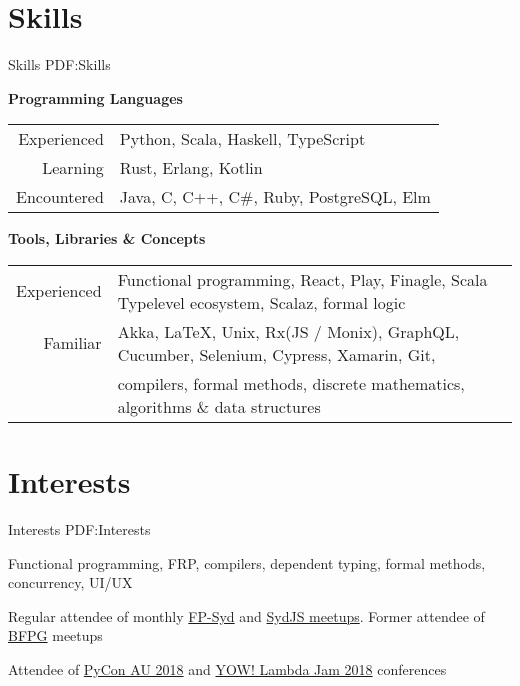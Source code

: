 \documentclass[a4paper,10pt,oneside]{article}
\begin{document}
\begin{minipage}[t][0pt]{\linewidth}
\begin{body}

\section
{Skills}
{Skills}
{PDF:Skills}

\textbf{Programming Languages}
\par
\begin{tabular}{rl}
\par Experienced & Python, Scala, Haskell, TypeScript\\
\par Learning & Rust, Erlang, Kotlin\\
\par Encountered & Java, C, C++, C\#, Ruby, PostgreSQL, Elm
\end{tabular}

\EntryGap
\EntryGap

\textbf{Tools, Libraries \& Concepts}

\par
\begin{tabular}{rl}
\par Experienced & Functional programming, React, Play, Finagle, Scala Typelevel ecosystem, Scalaz, formal logic\\
\par Familiar & Akka, \LaTeX, Unix, Rx(JS / Monix), GraphQL, Cucumber, Selenium, Cypress, Xamarin, Git,\\
& compilers, formal methods, discrete mathematics, algorithms \& data structures\\
\end{tabular}

\EntryGap

\section
{Interests}
{Interests}
{PDF:Interests}

\par Functional programming, FRP, compilers, dependent typing, formal methods, concurrency, UI/UX
\par Regular attendee of monthly \href{https://www.meetup.com/en-AU/FP-Syd/}{FP-Syd} and \href{https://www.sydjs.com/}{SydJS meetups}. Former attendee of \href{https://www.meetup.com/en-AU/Brisbane-Functional-Programming-Group/}{BFPG} meetups
\par Attendee of \href{https://2018.pycon-au.org/}{PyCon AU 2018} and \href{http://lambdajam.yowconference.com.au/}
{YOW! Lambda Jam 2018} conferences



\end{body}
\end{minipage}
\end{document}
